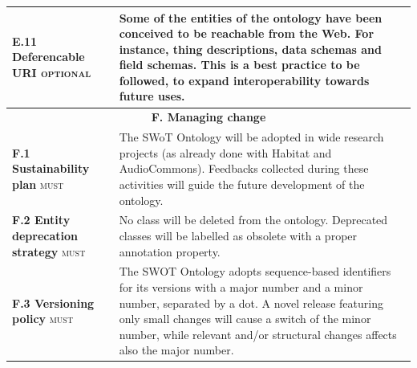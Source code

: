 \begin{table}
\begin{tabular}{p{}p{}}
\textbf{E.11 Deferencable URI} \textsc{optional} & Some of the entities of the ontology have been conceived to be reachable from the Web. For instance, thing descriptions, data schemas and field schemas. This is a best practice to be followed, to expand interoperability towards future uses. \\
\toprule
\multicolumn{2}{c}{\textbf{F. Managing change}} \\ \midrule
\textbf{F.1 Sustainability plan} \textsc{must} & The SWoT Ontology will be adopted in wide research projects (as already done with Habitat and AudioCommons). Feedbacks collected during these activities will guide the future development of the ontology. \\
\textbf{F.2 Entity deprecation strategy} \textsc{must}  & No class will be deleted from the ontology. Deprecated classes will be labelled as obsolete with a proper annotation property. \\
\textbf{F.3 Versioning policy} \textsc{must} & The SWOT Ontology adopts sequence-based identifiers for its versions with a major number and a minor number, separated by a dot. A novel release featuring only small changes will cause a switch of the minor number, while relevant and/or structural changes affects also the major number.\\
\toprule
\end{tabular}
\end{table}

